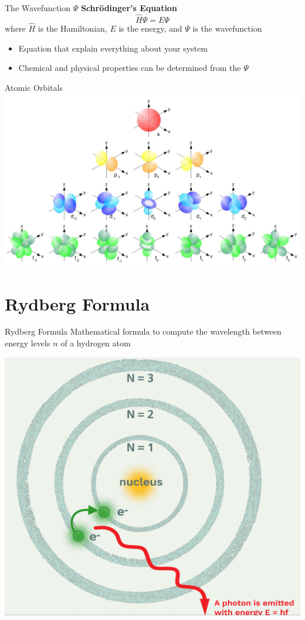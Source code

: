 \documentclass[11pt]{beamer}
\begin{document}
\begin{frame}{The Wavefunction $\Psi$}
  \textbf{Schr\"{o}dinger's Equation}
  \begin{equation}
    \hat{H}\Psi = E\Psi
  \end{equation}
  where $\hat{H}$ is the Hamiltonian, $E$ is the energy,
  and $\Psi$ is the wavefunction
  \begin{itemize}
  \item Equation that explain everything about your system
  \item Chemical and physical properties can be determined
    from the $\Psi$
  \end{itemize}
\end{frame}

\begin{frame}{Atomic Orbitals}
  \centering
  \includegraphics[width=\linewidth]{single_elect_orb}
\end{frame}

\section{Rydberg Formula}

\begin{frame}{Rydberg Formula}
  Mathematical formula to compute the wavelength between energy
  levels $n$ of a hydrogen atom

  \centering
  \includegraphics[width=0.55\linewidth]{bohr_model}
\end{frame}
\end{document}
